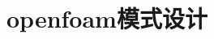 \documentclass{beamer}
\begin{document}
\section{openfoam模式设计}












% 














\end{document}
